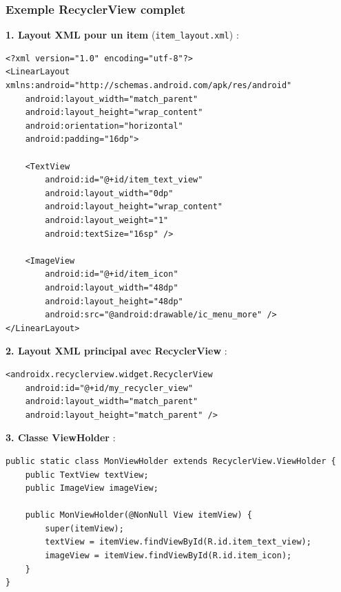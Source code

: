 \documentclass[11pt,a4paper]{article}
\begin{document}
\subsubsection{Exemple RecyclerView complet}

\textbf{1. Layout XML pour un item} (\texttt{item\_layout.xml}) :
\begin{lstlisting}[style=XML]
<?xml version="1.0" encoding="utf-8"?>
<LinearLayout xmlns:android="http://schemas.android.com/apk/res/android"
    android:layout_width="match_parent"
    android:layout_height="wrap_content"
    android:orientation="horizontal"
    android:padding="16dp">
    
    <TextView
        android:id="@+id/item_text_view"
        android:layout_width="0dp"
        android:layout_height="wrap_content"
        android:layout_weight="1"
        android:textSize="16sp" />
    
    <ImageView
        android:id="@+id/item_icon"
        android:layout_width="48dp"
        android:layout_height="48dp"
        android:src="@android:drawable/ic_menu_more" />
</LinearLayout>
\end{lstlisting}

\textbf{2. Layout XML principal avec RecyclerView} :
\begin{lstlisting}[style=XML]
<androidx.recyclerview.widget.RecyclerView
    android:id="@+id/my_recycler_view"
    android:layout_width="match_parent"
    android:layout_height="match_parent" />
\end{lstlisting}

\textbf{3. Classe ViewHolder} :
\begin{lstlisting}
public static class MonViewHolder extends RecyclerView.ViewHolder {
    public TextView textView;
    public ImageView imageView;
    
    public MonViewHolder(@NonNull View itemView) {
        super(itemView);
        textView = itemView.findViewById(R.id.item_text_view);
        imageView = itemView.findViewById(R.id.item_icon);
    }
}
\end{lstlisting}
\end{document}
